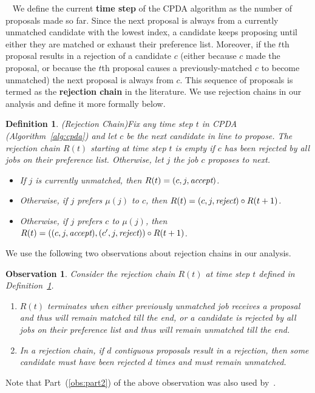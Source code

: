 \documentclass[11pt]{amsart}
\newtheorem{observation}[theorem]{Observation}
\newtheorem{definition}[theorem]{Definition}
\newcommand{\pparagraph}[1]{
\vspace{0.13in}\noindent{\textbf{\boldmath #1}}~}
\newcommand{\defn}{\textbf}
\begin{document}
\pparagraph{Algorithm terminology.}  
We define the current \defn{time step} of the CPDA algorithm as the number of proposals made so far. Since the next proposal is always from a currently unmatched candidate with the lowest index, a candidate keeps proposing until either they are matched or exhaust their preference list. 
Moreover, if the $t$th proposal results in a rejection of a candidate $c$ (either because $c$ made the proposal, or because the $t$th proposal causes a previously-matched $c$ to become unmatched) the next proposal is always from $c$.  This sequence of proposals is termed as the \defn{rejection chain} in the literature.   We use rejection chains in our analysis and define it more formally below.




\begin{definition}(Rejection Chain)\label{def:rejectionchain}
Fix any time step $t$ in CPDA (Algorithm~\ref{alg:cpda}) and let $c$ be the next candidate in line to propose. The rejection chain $R(t)$ starting at time step $t$ is empty if $c$ has been rejected by all jobs on their preference list.  Otherwise, let $j$ the job $c$ proposes to next.
\begin{itemize}
    \item If  $j$ is currently unmatched, then $R(t) = (c, j, \emph{accept})$.
\item Otherwise, if $j$ prefers $\mu(j)$ to $c$, then $R(t) = (c, j, \emph{reject}) \circ R(t+1)$.  
    \item Otherwise, if $j$ prefers $c$ to $\mu(j)$, then
    $R(t) = ((c, j, \emph{accept}), (c', j, \emph{reject})) \circ R(t+1)$.
\end{itemize}
\end{definition}


We use the following two observations about rejection chains in our analysis.
\begin{observation}\label{obs:rejectchain}
Consider the rejection chain $R(t)$ at time step $t$ defined in Definition~\ref{def:rejectionchain}.
\begin{enumerate}
    \item\label{obs:part1} $R(t)$ terminates when either previously unmatched job receives a proposal and thus will remain matched till the end, or a candidate is rejected by all jobs on their preference list and thus will remain unmatched till the end.
    \item\label{obs:part2} In a rejection chain, if $d$ contiguous proposals result in a rejection, then some candidate must have been rejected $d$ times and must remain unmatched.  
\end{enumerate}
\end{observation}
Note that Part~(\ref{obs:part2}) of the above observation was also used by~\cite{kanoria2021matching}.
\end{document}
